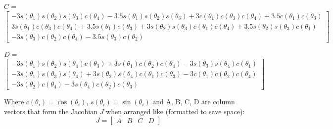\documentclass[11pt]{article}
\begin{document}
\begin{center}
    \textbf{$C =$}
    \[\left[\begin{matrix}- 3 s{\left(\theta_{1} \right)} s{\left(\theta_{2} \right)} s{\left(\theta_{3} \right)} c{\left(\theta_{4} \right)} - 3.5 s{\left(\theta_{1} \right)} s{\left(\theta_{2} \right)} s{\left(\theta_{3} \right)} + 3 c{\left(\theta_{1} \right)} c{\left(\theta_{3} \right)} c{\left(\theta_{4} \right)} + 3.5 c{\left(\theta_{1} \right)} c{\left(\theta_{3} \right)}\\3 s{\left(\theta_{1} \right)} c{\left(\theta_{3} \right)} c{\left(\theta_{4} \right)} + 3.5 s{\left(\theta_{1} \right)} c{\left(\theta_{3} \right)} + 3 s{\left(\theta_{2} \right)} s{\left(\theta_{3} \right)} c{\left(\theta_{1} \right)} c{\left(\theta_{4} \right)} + 3.5 s{\left(\theta_{2} \right)} s{\left(\theta_{3} \right)} c{\left(\theta_{1} \right)}\\- 3 s{\left(\theta_{3} \right)} c{\left(\theta_{2} \right)} c{\left(\theta_{4} \right)} - 3.5 s{\left(\theta_{3} \right)} c{\left(\theta_{2} \right)}\end{matrix}\right]\]

    \textbf{$D =$}
    \[\left[\begin{matrix}- 3 s{\left(\theta_{1} \right)} s{\left(\theta_{2} \right)} s{\left(\theta_{4} \right)} c{\left(\theta_{3} \right)} + 3 s{\left(\theta_{1} \right)} c{\left(\theta_{2} \right)} c{\left(\theta_{4} \right)} - 3 s{\left(\theta_{3} \right)} s{\left(\theta_{4} \right)} c{\left(\theta_{1} \right)}\\- 3 s{\left(\theta_{1} \right)} s{\left(\theta_{3} \right)} s{\left(\theta_{4} \right)} + 3 s{\left(\theta_{2} \right)} s{\left(\theta_{4} \right)} c{\left(\theta_{1} \right)} c{\left(\theta_{3} \right)} - 3 c{\left(\theta_{1} \right)} c{\left(\theta_{2} \right)} c{\left(\theta_{4} \right)}\\- 3 s{\left(\theta_{2} \right)} c{\left(\theta_{4} \right)} - 3 s{\left(\theta_{4} \right)} c{\left(\theta_{2} \right)} c{\left(\theta_{3} \right)}\end{matrix}\right]\]
\end{center}
Where $c(\theta_i)=\cos(\theta_i)$, $s(\theta_i)=\sin(\theta_i)$ and A, B, C, D are column vectors that form the Jacobian \(J\) when arranged like (formatted to save space):
\[J = \left[\begin{matrix} A & B & C & D \end{matrix}\right]\]
\end{document}
